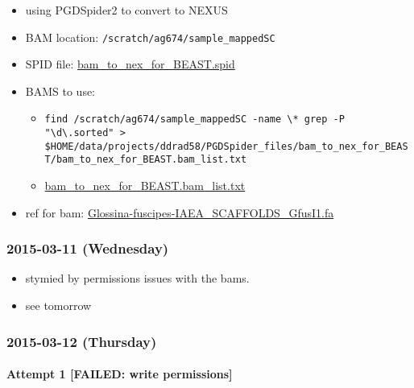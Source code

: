 \documentclass[letterpaper]{scrartcl}
\begin{document}
\begin{itemize}
\itemsep1pt\parskip0pt
\item
  using PGDSpider2 to convert to NEXUS
\item
  BAM location: \texttt{/scratch/ag674/sample\_mappedSC}
\item
  SPID file:
  \href{file:///home/gus/remote_mounts/louise/data/projects/ddrad58/PGDSpider_files/bam_to_nex_for_BEAST/bam_to_nex_for_BEAST.spid}{bam\_to\_nex\_for\_BEAST.spid}
\item
  BAMS to use:

  \begin{itemize}
  \itemsep1pt\parskip0pt
  \item
    \texttt{find /scratch/ag674/sample\_mappedSC -name \textbackslash{}* \textbar{} grep -P "\textbackslash{}d\textbackslash{}.sorted" \textgreater{} \$HOME/data/projects/ddrad58/PGDSpider\_files/bam\_to\_nex\_for\_BEAST/bam\_to\_nex\_for\_BEAST.bam\_list.txt}
  \item
    \href{file:///home/gus/remote_mounts/louise/data/projects/ddrad58/PGDSpider_files/bam_to_nex_for_BEAST/bam_to_nex_for_BEAST.bam_list.txt}{bam\_to\_nex\_for\_BEAST.bam\_list.txt}
  \end{itemize}
\item
  ref for bam:
  \href{file:///home/gus/remote_mounts/louise/data/genomes/glossina_fuscipes/assemblies/GfusI1/Glossina-fuscipes-IAEA_SCAFFOLDS_GfusI1.fa}{Glossina-fuscipes-IAEA\_SCAFFOLDS\_GfusI1.fa}
\end{itemize}

\subsubsection{2015-03-11 (Wednesday)}\label{wednesday-1}

\begin{itemize}
\itemsep1pt\parskip0pt
\item
  stymied by permissions issues with the bams.
\item
  see tomorrow
\end{itemize}

\subsubsection{2015-03-12 (Thursday)}\label{thursday}

\paragraph{Attempt 1 {[}FAILED: write
permissions{]}}\label{attempt-1-failed-write-permissions}
\end{document}
